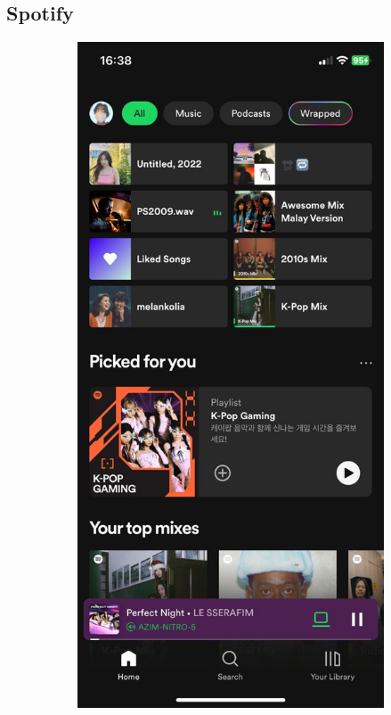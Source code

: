\subsection{Spotify}
\begin{figure} [h]
    \centering
    \begin{subfigure}{.3\linewidth}
      \centering
      \includegraphics[width = \linewidth]{mainmatter/images/spotify1.jpg}

\end{subfigure}
\end{figure}
